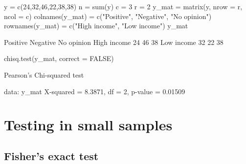 \documentclass[a4paper]{article}\usepackage[]{graphicx}\usepackage[]{xcolor}
\begin{document}
\begin{Schunk}
\begin{Sinput}
y = c(24,32,46,22,38,38)
n = sum(y)
c = 3
r = 2
y_mat = matrix(y, nrow = r, ncol = c)
colnames(y_mat) = c("Positive", "Negative", "No opinion")
rownames(y_mat) = c("High income", "Low income")
y_mat
\end{Sinput}
\begin{Soutput}
            Positive Negative No opinion
High income       24       46         38
Low income        32       22         38
\end{Soutput}
\begin{Sinput}
chisq.test(y_mat, correct = FALSE)
\end{Sinput}
\begin{Soutput}

	Pearson's Chi-squared test

data:  y_mat
X-squared = 8.3871, df = 2, p-value = 0.01509
\end{Soutput}
\end{Schunk}
\section{Testing in small samples}\label{sec:9}
\subsection{Fisher's exact test}
\end{document}
